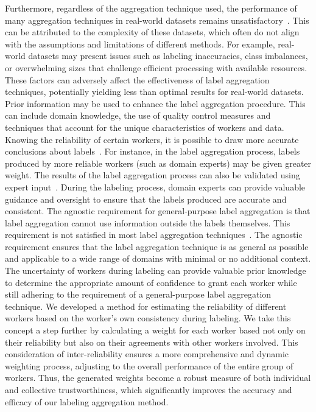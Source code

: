 \documentclass[default]{bst/sn-jnl_mine}%
\begin{document}
Furthermore, regardless of the aggregation technique used, the performance of many aggregation techniques in real-world datasets remains unsatisfactory~\cite{liu_Exploiting_2021}. This can be attributed to the complexity of these datasets, which often do not align with the assumptions and limitations of different methods. For example, real-world datasets may present issues such as labeling inaccuracies, class imbalances, or overwhelming sizes that challenge efficient processing with available resources. These factors can adversely affect the effectiveness of label aggregation techniques, potentially yielding less than optimal results for real-world datasets.
Prior information may be used to enhance the label aggregation procedure.
This can include domain knowledge, the use of quality control measures and techniques that account for the unique characteristics of workers and data. Knowing the reliability of certain workers, it is possible to draw more accurate conclusions about labels~\cite{li_Crowdsourced_2017}. For instance, in the label aggregation process, labels produced by more reliable workers (such as domain experts) may be given greater weight. The results of the label aggregation process can also be validated using expert input~\cite{liu_Improving_2017}. During the labeling process, domain experts can provide valuable guidance and oversight to ensure that the labels produced are accurate and consistent.
The agnostic requirement for general-purpose label aggregation is that label aggregation cannot use information outside the labels themselves. This requirement is not satisfied in most label aggregation techniques~\cite{zhang_Crowdsourced_2019}. The agnostic requirement ensures that the label aggregation technique is as general as possible and applicable to a wide range of domains with minimal or no additional context.
The uncertainty of workers during labeling can provide valuable prior knowledge to determine the appropriate amount of confidence to grant each worker while still adhering to the requirement of a general-purpose label aggregation technique. We developed a method for estimating the reliability of different workers based on the worker's own consistency during labeling. We take this concept a step further by calculating a weight for each worker based not only on their reliability but also on their agreements with other workers involved. This consideration of inter-reliability ensures a more comprehensive and dynamic weighting process, adjusting to the overall performance of the entire group of workers. Thus, the generated weights become a robust measure of both individual and collective trustworthiness, which significantly improves the accuracy and efficacy of our labeling aggregation method.
\end{document}
